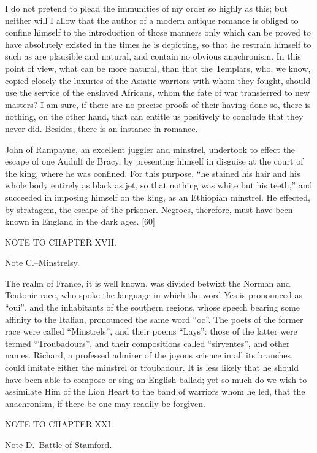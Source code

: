 I do not pretend to plead the immunities of my order so highly as this;
but neither will I allow that the author of a modern antique romance is
obliged to confine himself to the introduction of those manners only
which can be proved to have absolutely existed in the times he is
depicting, so that he restrain himself to such as are plausible and
natural, and contain no obvious anachronism. In this point of view, what
can be more natural, than that the Templars, who, we know, copied
closely the luxuries of the Asiatic warriors with whom they fought,
should use the service of the enslaved Africans, whom the fate of war
transferred to new masters? I am sure, if there are no precise proofs of
their having done so, there is nothing, on the other hand, that can
entitle us positively to conclude that they never did. Besides, there is
an instance in romance.

John of Rampayne, an excellent juggler and minstrel, undertook to effect
the escape of one Audulf de Bracy, by presenting himself in disguise at
the court of the king, where he was confined. For this purpose, ``he
stained his hair and his whole body entirely as black as jet, so that
nothing was white but his teeth,'' and succeeded in imposing himself on
the king, as an Ethiopian minstrel. He effected, by stratagem, the
escape of the prisoner. Negroes, therefore, must have been known in
England in the dark ages. {[}60{]}

NOTE TO CHAPTER XVII.

Note C.--Minstrelsy.

The realm of France, it is well known, was divided betwixt the Norman
and Teutonic race, who spoke the language in which the word Yes is
pronounced as ``oui'', and the inhabitants of the southern regions,
whose speech bearing some affinity to the Italian, pronounced the same
word ``oc''. The poets of the former race were called ``Minstrels'', and
their poems ``Lays'': those of the latter were termed ``Troubadours'',
and their compositions called ``sirventes'', and other names. Richard, a
professed admirer of the joyous science in all its branches, could
imitate either the minstrel or troubadour. It is less likely that he
should have been able to compose or sing an English ballad; yet so much
do we wish to assimilate Him of the Lion Heart to the band of warriors
whom he led, that the anachronism, if there be one may readily be
forgiven.

NOTE TO CHAPTER XXI.

Note D.--Battle of Stamford.

